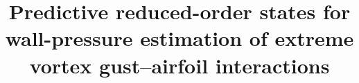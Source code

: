 
\title{Predictive reduced-order states for wall-pressure estimation of
extreme vortex gust--airfoil interactions}


